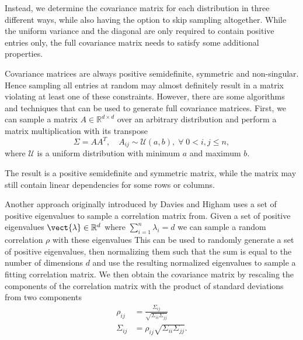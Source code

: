 Instead, we determine the covariance matrix for each distribution in three different ways, while also having the option to skip sampling altogether.
While the uniform variance and the diagonal are only required to contain positive entries only, the full covariance matrix needs to satisfy some additional properties.

Covariance matrices are always positive semidefinite, symmetric and non-singular. 
Hence sampling all entries at random may almost definitely result in a matrix violating at least one of these constraints.
However, there are some algorithms and techniques that can be used to generate full covariance matrices.
First, we can sample a matrix $A\in \mathbb{R}^{d \times d}$ over an arbitrary distribution and perform a matrix multiplication with its transpose
\begin{equation}
    \Sigma = AA^T, \quad A_{ij}\sim\mathcal{U}(a,b), \; \forall \;0 < i,j \leq n,
\end{equation}
where $\mathcal{U}$ is a uniform distribution with minimum $a$ and maximum $b$.

The result is a positive semidefinite and symmetric matrix, while the matrix may still contain linear dependencies for some rows or columns.

Another approach originally introduced by Davies and Higham \cite{davies2000numerically} uses a set of positive eigenvalues to sample a correlation matrix from.
Given a set of positive eigenvalues $\vect{\lambda}\in \mathbb{R}^d$ where $\sum_{i=1}^n \lambda_i = d$ we can sample a random correlation $\rho$ with these eigenvalues
This can be used to randomly generate a set of positive eigenvalues, then normalizing them such that the sum is equal to the number of dimensions $d$ and use the resulting normalized eigenvalues to sample a fitting correlation matrix. 
We then obtain the covariance matrix by rescaling the components of the correlation matrix with the product of standard deviations from two components 
\begin{equation}
    \begin{split}
            \rho_{ij} &= \frac{\Sigma_{ij}}{\sqrt{\Sigma_{ii}\Sigma_{jj}}} \\
            \Sigma_{ij} &=  \rho_{ij}\sqrt{\Sigma_{ii}\Sigma_{jj}}.
    \end{split}
\end{equation}

